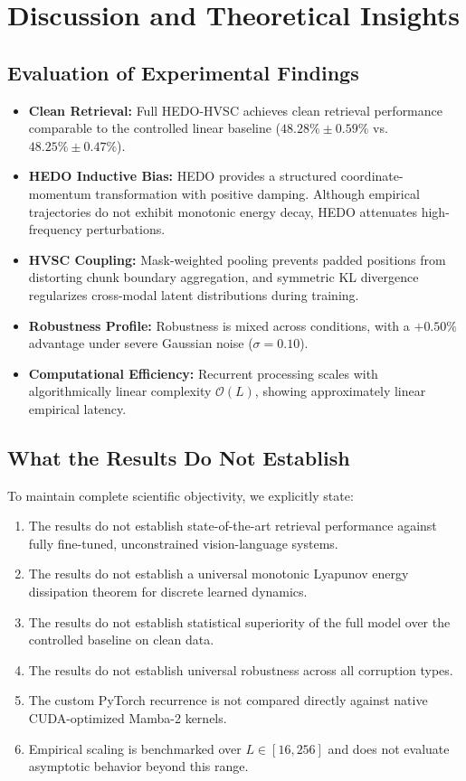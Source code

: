 \documentclass[journal]{IEEEtran}
\begin{document}
\section{Discussion and Theoretical Insights}
\label{sec:discussion}

\subsection{Evaluation of Experimental Findings}
\begin{itemize}
    \item \textbf{Clean Retrieval:} Full HEDO-HVSC achieves clean retrieval performance comparable to the controlled linear baseline ($48.28\% \pm 0.59\%$ vs. $48.25\% \pm 0.47\%$).
    \item \textbf{HEDO Inductive Bias:} HEDO provides a structured coordinate-momentum transformation with positive damping. Although empirical trajectories do not exhibit monotonic energy decay, HEDO attenuates high-frequency perturbations.
    \item \textbf{HVSC Coupling:} Mask-weighted pooling prevents padded positions from distorting chunk boundary aggregation, and symmetric KL divergence regularizes cross-modal latent distributions during training.
    \item \textbf{Robustness Profile:} Robustness is mixed across conditions, with a $+0.50\%$ advantage under severe Gaussian noise ($\sigma=0.10$).
    \item \textbf{Computational Efficiency:} Recurrent processing scales with algorithmically linear complexity $\mathcal{O}(L)$, showing approximately linear empirical latency.
\end{itemize}

\subsection{What the Results Do Not Establish}
To maintain complete scientific objectivity, we explicitly state:
\begin{enumerate}
    \item The results do not establish state-of-the-art retrieval performance against fully fine-tuned, unconstrained vision-language systems.
    \item The results do not establish a universal monotonic Lyapunov energy dissipation theorem for discrete learned dynamics.
    \item The results do not establish statistical superiority of the full model over the controlled baseline on clean data.
    \item The results do not establish universal robustness across all corruption types.
    \item The custom PyTorch recurrence is not compared directly against native CUDA-optimized Mamba-2 kernels.
    \item Empirical scaling is benchmarked over $L \in [16, 256]$ and does not evaluate asymptotic behavior beyond this range.
\end{enumerate}
\end{document}
